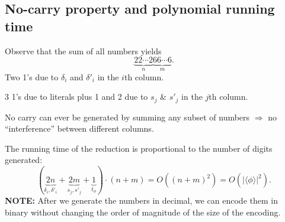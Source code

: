 \subsection{No-carry property and polynomial running time}
Observe that the sum of all numbers yields
\[\underbrace{22\cdots2}_{n}\underbrace{66\cdots6}_{m}.\]
Two 1's due to $\delta_i$ and $\delta'_i$ in the $i$th column.

3 1's due to literals plus 1 and 2 due to $s_j$ \& $s'_j$ in the $j$th column.

No carry can ever be generated by summing any subset of numbers $\Rightarrow$ no ``interference'' between different columns.

The running time of the reduction is proportional to the number of digits generated:
\[
(\underbrace{2n}_{\delta_i,\delta'_i}+\underbrace{2m}_{s_j,s'_j}+\underbrace{1}_{t_\phi})\cdot(n+m)=O((n+m)^2)=O(|\langle\phi\rangle|^2).
\]
\textbf{NOTE:} After we generate the numbers in decimal, we can encode them in binary without changing the order of magnitude of the size of the encoding.
